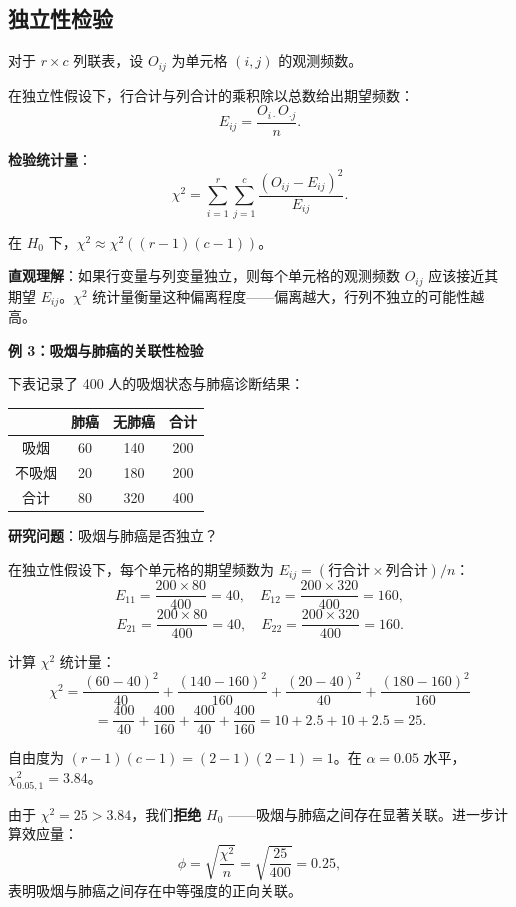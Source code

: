 \subsection{独立性检验}

对于 $r \times c$ 列联表，设 $O_{ij}$ 为单元格 $(i,j)$ 的观测频数。

在独立性假设下，行合计与列合计的乘积除以总数给出期望频数：
\[
E_{ij} = \frac{O_{i\cdot} O_{\cdot j}}{n}.
\label{eq:expected-frequency}\]

\textbf{检验统计量}：
\[
\chi^2 = \sum_{i=1}^r\sum_{j=1}^c \frac{(O_{ij} - E_{ij})^2}{E_{ij}}.
\label{eq:chi-square-independence}\]

在 $H_0$ 下，$\chi^2 \approx \chi^2((r-1)(c-1))$。

\textbf{直观理解}：如果行变量与列变量独立，则每个单元格的观测频数 $O_{ij}$ 应该接近其期望 $E_{ij}$。$\chi^2$ 统计量衡量这种偏离程度——偏离越大，行列不独立的可能性越高。

\textbf{例 3：吸烟与肺癌的关联性检验}

下表记录了 400 人的吸烟状态与肺癌诊断结果：

\begin{center}
\begin{tabular}{c|cc|c}
\hline
 & 肺癌 & 无肺癌 & 合计 \\ \hline
吸烟 & 60 & 140 & 200 \\
不吸烟 & 20 & 180 & 200 \\ \hline
合计 & 80 & 320 & 400 \\
\hline
\end{tabular}
\end{center}

\textbf{研究问题}：吸烟与肺癌是否独立？

在独立性假设下，每个单元格的期望频数为 $E_{ij} = (\text{行合计} \times \text{列合计})/n$：
\[
E_{11} = \frac{200 \times 80}{400} = 40, \quad
E_{12} = \frac{200 \times 320}{400} = 160,
\]
\[
E_{21} = \frac{200 \times 80}{400} = 40, \quad
E_{22} = \frac{200 \times 320}{400} = 160.
\]

计算 $\chi^2$ 统计量：
\[
\chi^2 = \frac{(60-40)^2}{40} + \frac{(140-160)^2}{160}
+ \frac{(20-40)^2}{40} + \frac{(180-160)^2}{160}
\]
\[
= \frac{400}{40} + \frac{400}{160} + \frac{400}{40} + \frac{400}{160}
= 10 + 2.5 + 10 + 2.5 = 25.
\]

自由度为 $(r-1)(c-1) = (2-1)(2-1) = 1$。在 $\alpha = 0.05$ 水平，$\chi^2_{0.05, 1} = 3.84$。

由于 $\chi^2 = 25 > 3.84$，我们\textbf{拒绝} $H_0$ ——吸烟与肺癌之间存在显著关联。进一步计算效应量：
\[
\phi = \sqrt{\frac{\chi^2}{n}} = \sqrt{\frac{25}{400}} = 0.25,
\]
表明吸烟与肺癌之间存在中等强度的正向关联。

